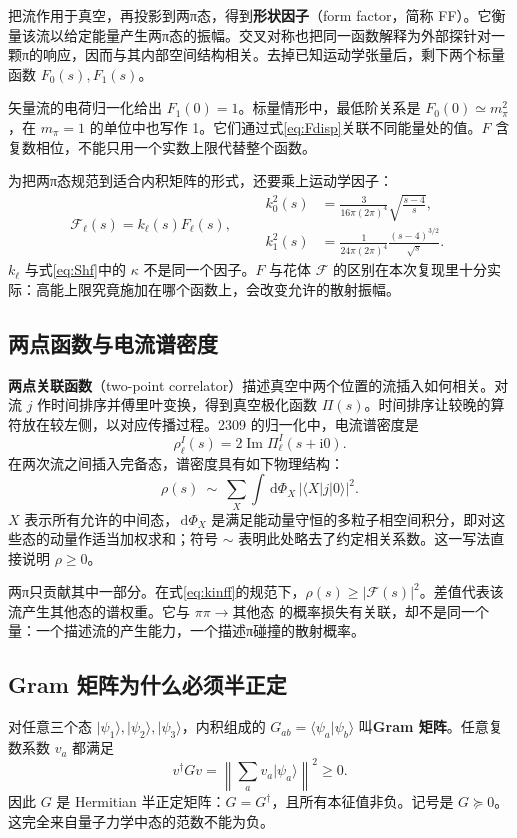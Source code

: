 \documentclass[UTF8,a4paper,11pt,fontset=fandol]{ctexart}
\numberwithin{equation}{section}
\newcommand{\dd}{\,\mathrm d}
\newcommand{\ii}{\mathrm i}
\newcommand{\Imm}{\operatorname{Im}}
\newcommand{\Fcal}{\mathcal F}
\newcommand{\ket}[1]{\lvert #1\rangle}
\newcommand{\bra}[1]{\langle #1\rvert}
\begin{document}
把流作用于真空，再投影到两π态，得到\textbf{形状因子}（form factor，简称 FF）。它衡量该流以给定能量产生两π态的振幅。交叉对称也把同一函数解释为外部探针对一颗π的响应，因而与其内部空间结构相关。去掉已知运动学张量后，剩下两个标量函数 \(F_0(s),F_1(s)\)。

矢量流的电荷归一化给出 \(F_1(0)=1\)。标量情形中，最低阶关系是 \(F_0(0)\simeq m_\pi^2\)，在 \(m_\pi=1\) 的单位中也写作 1。它们通过式\eqref{eq:Fdisp}关联不同能量处的值。\(F\) 含复数相位，不能只用一个实数上限代替整个函数。

为把两π态规范到适合内积矩阵的形式，还要乘上运动学因子：
\begin{equation}\label{eq:kinff}
\Fcal_\ell(s)=k_\ell(s)F_\ell(s),\qquad
\begin{aligned}
k_0^2(s)&=\frac{3}{16\pi(2\pi)^4}\sqrt{\frac{s-4}{s}},\\
k_1^2(s)&=\frac{1}{24\pi(2\pi)^4}\frac{(s-4)^{3/2}}{\sqrt{s}}.
\end{aligned}
\end{equation}
\(k_\ell\) 与式\eqref{eq:Shf}中的 \(\kappa\) 不是同一个因子。\(F\) 与花体 \(\Fcal\) 的区别在本次复现里十分实际：高能上限究竟施加在哪个函数上，会改变允许的散射振幅。

\subsection{两点函数与电流谱密度}
\textbf{两点关联函数}（two-point correlator）描述真空中两个位置的流插入如何相关。对流 \(j\) 作时间排序并傅里叶变换，得到真空极化函数 \(\Pi(s)\)。时间排序让较晚的算符放在较左侧，以对应传播过程。2309 的归一化中，电流谱密度是
\begin{equation}\label{eq:spectral}
\rho_\ell^I(s)=2\Imm\Pi_\ell^I(s+\ii0).
\end{equation}
在两次流之间插入完备态，谱密度具有如下物理结构：
\begin{equation}
\rho(s)\ \sim\ \sum_X\int\dd\Phi_X\,
\big|\bra X j\ket0\big|^2.
\end{equation}
\(X\) 表示所有允许的中间态，\(\dd\Phi_X\) 是满足能动量守恒的多粒子相空间积分，即对这些态的动量作适当加权求和；符号 \(\sim\) 表明此处略去了约定相关系数。这一写法直接说明 \(\rho\ge0\)。

两π只贡献其中一部分。在式\eqref{eq:kinff}的规范下，\(\rho(s)\ge|\Fcal(s)|^2\)。差值代表该流产生其他态的谱权重。它与 \(\pi\pi\to\text{其他态}\) 的概率损失有关联，却不是同一个量：一个描述流的产生能力，一个描述π碰撞的散射概率。

\subsection{Gram 矩阵为什么必须半正定}
对任意三个态 \(\ket{\psi_1},\ket{\psi_2},\ket{\psi_3}\)，内积组成的 \(G_{ab}=\langle\psi_a|\psi_b\rangle\) 叫\textbf{Gram 矩阵}。任意复数系数 \(v_a\) 都满足
\begin{equation}
v^\dagger Gv=\left\|\sum_a v_a\ket{\psi_a}\right\|^2\ge0.
\end{equation}
因此 \(G\) 是 Hermitian 半正定矩阵：\(G=G^\dagger\)，且所有本征值非负。记号是 \(G\succeq0\)。这完全来自量子力学中态的范数不能为负。
\end{document}

